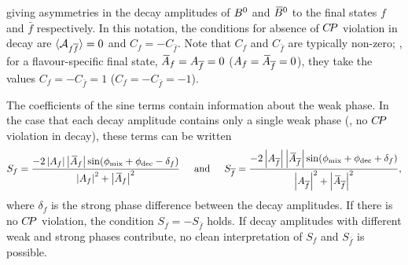 giving asymmetries in the decay amplitudes of $B^0$ and $\kern 0.18em\overline{\kern -0.18em B}{}^0$
to the final states $f$ and $\bar{f}$ respectively.
In this notation, the conditions for absence of $C\!P$ violation in decay are
$\Adirnoncp = 0$ and $C_f = - C_{\bar{f}}$.
Note that $C_f$ and $C_{\bar{f}}$ are typically non-zero;
\eg, for a flavour-specific final state, 
$\Abarf = \Afbar = 0$ ($\Af = \Abarfbar = 0$), they take the values
$C_f = - C_{\bar{f}} = 1$ ($C_f = - C_{\bar{f}} = -1$).

The coefficients of the sine terms
contain information about the weak phase. 
In the case that each decay amplitude contains only a single weak phase
(\ie, no $C\!P$ violation in decay),
these terms can be written
\begin{equation}
  S_f = 
  \frac{ 
    - 2 \left| \Af \right| \left| \Abarf \right| 
    \sin( \phi_{\rm mix} + \phi_{\rm dec} - \delta_f )
  }{
    \left| \Af \right|^2 + \left| \Abarf \right|^2
  } 
  \hspace{5mm}
  {\rm and}
  \hspace{5mm}
  S_{\bar{f}} = 
  \frac{
    - 2 \left| \Afbar \right| \left| \Abarfbar \right| 
    \sin( \phi_{\rm mix} + \phi_{\rm dec} + \delta_f )
  }{
    \left| \Afbar \right|^2 + \left| \Abarfbar \right|^2
  },
\end{equation}
where $\delta_f$ is the strong phase difference between the decay amplitudes.
If there is no $C\!P$ violation, the condition $S_f = - S_{\bar{f}}$ holds.
If decay amplitudes with different weak and strong phases contribute,
no clean interpretation of $S_f$ and $S_{\bar{f}}$ is possible.

